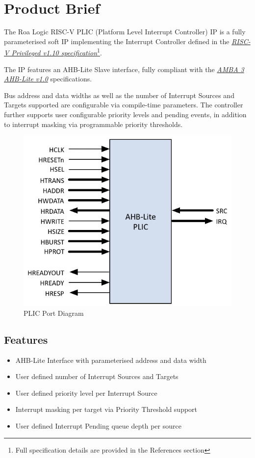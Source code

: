 \chapter{Product Brief}

The Roa Logic RISC-V PLIC (Platform Level Interrupt Controller) IP is a fully parameterised soft IP implementing the Interrupt Controller defined in the \emph{\href{https://github.com/riscv/riscv-isa-manual/blob/master/release/riscv-privileged-v1.10.pdf}{RISC-V Privileged v1.10 specification}}\footnote{Full specification details are provided in the References section}.

The IP features an AHB-Lite Slave interface, fully compliant with the \emph{\href{https://www.arm.com/products/system-ip/amba-specifications}{AMBA 3 AHB-Lite v1.0}} specifications.

Bus address and data widths as well as the number of Interrupt Sources and Targets supported are configurable via compile-time parameters. The controller further supports user configurable priority levels and pending events, in addition to interrupt masking via programmable priority thresholds.

\begin{figure}[!htb]
  \includegraphics{assets/img/plic-ports}
  \caption{PLIC Port Diagram}
  \label{fig:PORTDIAG}
\end{figure}

\section{Features}

\begin{itemize}
	\item
		AHB-Lite Interface with parameterised address and data width
	\item
		User defined number of Interrupt Sources and Targets
	\item
		User defined priority level per Interrupt Source
	\item
		Interrupt masking per target via Priority Threshold support
	\item
		User defined Interrupt Pending queue depth per source
\end{itemize}
